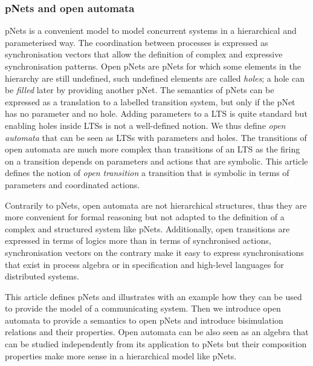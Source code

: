 \documentclass{lmcs}
\begin{document}
\subsubsection*{pNets and open automata}
pNets is a convenient model to model concurrent systems in a hierarchical and parameterised way. The coordination between processes is expressed as synchronisation vectors that allow the definition of complex and expressive synchronisation patterns.
Open pNets are pNets for which some elements in the hierarchy are still undefined, such undefined elements are called \emph{holes}; a hole can be \emph{filled} later by providing another pNet.
 The semantics of pNets can be expressed as a translation to a labelled transition system, but only if the pNet has no parameter and no hole. Adding parameters to a LTS is quite standard but enabling holes inside LTSs is not a well-defined notion. 
We thus define \emph{open automata} that can be seen as LTSs with parameters and holes. The transitions of open automata are much more complex than transitions of an LTS as the firing on a transition depends on parameters and actions that are symbolic. This article defines the notion of \emph{open transition} a transition that is symbolic in terms of parameters and coordinated actions.

Contrarily to pNets, open automata are not hierarchical structures, thus they are more convenient for formal reasoning but not adapted to the definition of a complex and structured system like pNets. Additionally, open transitions are expressed in terms of logics more than in terms of synchronised actions, synchronisation vectors on the contrary make it easy to express synchronisations that exist in process algebra or in specification and high-level languages for distributed systems.

This article defines pNets and illustrates with an example how they can be used to provide the model of a communicating system. Then we introduce open automata to provide a semantics to open pNets and introduce bisimulation relations and their properties.
Open automata can be also seen as an algebra that can be studied independently from its application to pNets but their composition properties make more sense in a hierarchical model like pNets.
\end{document}
